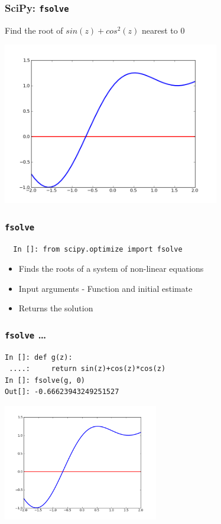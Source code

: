 \documentclass[14pt,compress]{beamer}
\newcounter{time}
\newcommand{\inctime}[1]{\addtocounter{time}{#1}{\tiny \thetime\ m}}
\newcommand{\typ}[1]{\lstinline{#1}}
\begin{document}
\begin{frame}[fragile]
\frametitle{SciPy: \typ{fsolve}}
Find the root of $sin(z)+cos^2(z)$ nearest to $0$
\vspace{-0.1in}
\begin{center}
\includegraphics[height=2.8in, interpolate=true]{data/fsolve}
\end{center}
\end{frame}

\begin{frame}[fragile]
\frametitle{\typ{fsolve}}
\begin{small}
\begin{lstlisting}
  In []: from scipy.optimize import fsolve
\end{lstlisting}
\end{small}
\begin{itemize}
\item Finds the roots of a system of non-linear equations
\item Input arguments - \alert{Function} and initial estimate
\item Returns the solution
\end{itemize}
\end{frame}

\begin{frame}[fragile]
\frametitle{\typ{fsolve} \ldots}
\begin{lstlisting}
In []: def g(z):
 ....:     return sin(z)+cos(z)*cos(z)
In []: fsolve(g, 0)
Out[]: -0.66623943249251527
\end{lstlisting}
\begin{center}
\includegraphics[height=2in, interpolate=true]{data/fsolve}
\end{center}
\inctime{10}
\end{frame}
\end{document}
